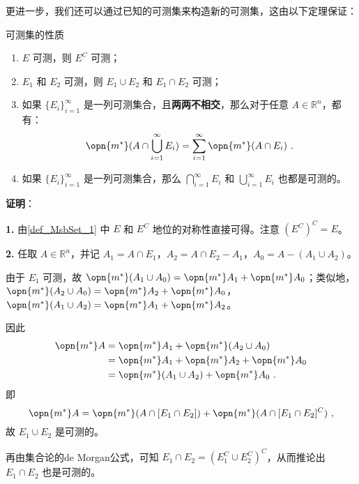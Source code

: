 更进一步，我们还可以通过已知的可测集来构造新的可测集，这由以下定理保证：

\begin{theorem}{可测集的性质}\label{the_MsbSet_1}

\begin{enumerate}
\item $E$ 可测，则 $E^C$ 可测；
\item $E_1$ 和 $E_2$ 可测，则 $E_1\cup E_2$ 和 $E_1\cap E_2$ 可测；
\item 如果 $\{E_i\}_{i=1}^{\infty}$ 是一列可测集合，且\textbf{两两不相交}，那么对于任意 $A\in\mathbb{R}^n$，都有：
\begin{equation}\label{eq_MsbSet_4}
\opn{m^*}(A\cap \bigcup_{i=1}^{\infty}E_i)=\sum_{i=1}^{\infty}\opn{m^*}(A\cap E_i)~.
\end{equation}
\item 如果 $\{E_i\}_{i=1}^{\infty}$ 是一列可测集合，那么 $\bigcap_{i=1}^{\infty}E_i$ 和 $\bigcup_{i=1}^{\infty}E_i$ 也都是可测的。
\end{enumerate}

\end{theorem}

\textbf{证明}：


\textbf{1.} 由\autoref{def_MsbSet_1} 中 $E$ 和 $E^C$ 地位的对称性直接可得。注意 $(E^C)^C=E$。

\textbf{2.} 任取 $A\in\mathbb{R}^n$，并记 $A_1=A\cap E_1$，$A_2=A\cap E_2-A_1$，$A_0=A-(A_1\cup A_2)$。


由于 $E_1$ 可测，故 $\opn{m^*}(A_1\cup A_0)=\opn{m^*}A_1+\opn{m^*}A_0$；类似地，$\opn{m^*}(A_2\cup A_0)=\opn{m^*}A_2+\opn{m^*}A_0$，$\opn{m^*}(A_1\cup A_2)=\opn{m^*}A_1+\opn{m^*}A_2$。

因此
\begin{equation}
\begin{aligned}
\opn{m^*}A&=\opn{m^*}A_1+\opn{m^*}(A_2\cup A_0)\\
&=\opn{m^*}A_1+\opn{m^*}A_2+\opn{m^*}A_0\\
&=\opn{m^*}(A_1\cup A_2)+\opn{m^*}A_0~.
\end{aligned}
\end{equation}
即
\begin{equation}
\opn{m^*}A=\opn{m^*}(A\cap [E_1\cap E_2])+\opn{m^*}(A\cap [E_1\cap E_2]^C)~,
\end{equation}
故 $E_1\cup E_2$ 是可测的。

再由集合论的de Morgan公式，可知 $E_1\cap E_2=(E_1^C\cup E_2^C)^C$，从而推论出 $E_1\cap E_2$ 也是可测的。

